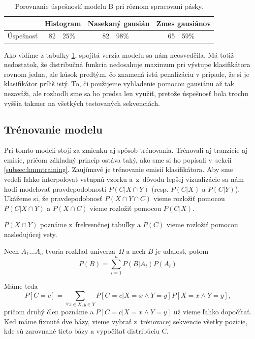 \begin{table}[htp]
\centering
\begin{tabular}{c|r@{,}lr@{,}lr@{,}l}
& \multicolumn{2}{c}{Histogram}  & \multicolumn{2}{c}{Nasekaný gausián} & \multicolumn{2}{c}{Zmes gausiánov}\\
\hline
Úspešnosť & 82 & 25\% & 82 & 98\% & 65 & 59\%\\
\end{tabular}
\vspace{0.5cm}
\caption[Porovnanie úspešností pri rôznom spracovaní pásky]{Porovnanie úspešností modelu B pri rôznom spracovaní pásky.}
\label{tab:success-b-tape}
\end{table}

Ako vidíme z tabuľky \ref{tab:success-b-tape}, spojitá verzia modelu sa nám neosvedčila. Má totiž nedostatok, že distribučná funkcia nedosahuje maximum pri výstupe klasifikátora rovnom jedna, ale kúsok predtým, čo znamená istú penalizáciu v prípade, že si je klasifikátor príliš istý. To, či použijeme vyhladenie pomocou gausiánu až tak nezaváži, ale rozhodli sme sa ho predsa len využiť, pretože úspešnosť bola trochu vyššia takmer na všetkých testovaných sekvenciách.

\subsection{Trénovanie modelu} %

Pri tomto modeli stojí za zmienku aj spôsob trénovania.
Trénovali aj tranzície aj emisie, pričom základný princíp ostáva taký, ako sme si ho popísali v~sekcii \ref{subsec:hmmtraining}.
Zaujímavé je trénovanie emisií klasifikátora. Aby sme vedeli ľahko interpolovať vstupnú vzorku a~z~dôvodu lepšej vizualizácie sa nám hodí modelovať pravdepodobnosti $P(C|X \cap Y)$ (resp. $P(C|X)$ a $P(C|Y)$). Ukážeme si, že pravdepodobnosť $P(X \cap Y \cap C)$ vieme rozložiť pomocou $P(C|X \cap Y)$ a $P(X \cap C)$ vieme rozložiť pomocou $P(C|X)$.

$P(X \cap Y)$ poznáme z~frekvenčnej tabuľky a $P(C)$ vieme rozložiť pomocou nasledujúcej vety.

\begin{vt}
Nech $A_1\dots A_n$ tvoria rozklad univerza~$\Omega$ a nech $B$ je udalosť, potom
$$P(B) = \sum_{i=1}^n P(B|A_i)P(A_i)$$
\end{vt}

Máme teda
$$P\left[C=c\right] = \sum_{\forall x\in X, y \in Y} P\left[C=c | X=x \wedge Y=y\right] P\left[X=x \wedge Y=y\right],$$
pričom druhý člen poznáme a $P\left[C=c | X=x \wedge Y=y\right]$ už vieme ľahko dopočítať. Keď máme fixnuté dve bázy, vieme vybrať z~trénovacej sekvencie všetky pozície, kde sú zarovnané tieto bázy a vypočítať distribúciu C.

